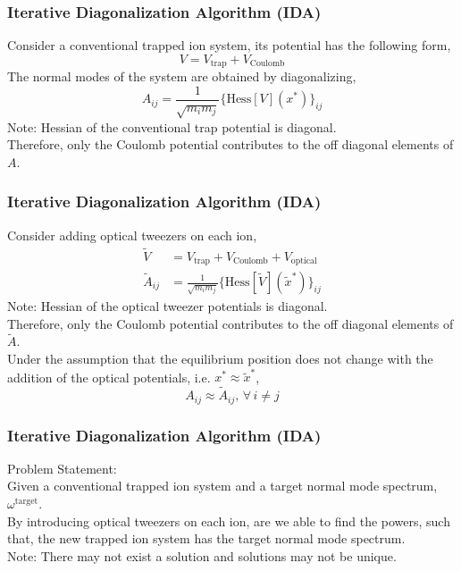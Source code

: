 \documentclass[10pt]{beamer}
\begin{document}
\begin{frame}[c]
\frametitle{Iterative Diagonalization Algorithm (IDA)}
Consider a conventional trapped ion system, its potential has the following form,
\begin{equation*}
V = V_{\mathrm{trap}} + V_{\mathrm{Coulomb}}
\end{equation*}
The normal modes of the system are obtained by diagonalizing,
\begin{equation*}
A_{ij} = \frac{1}{\sqrt{m_i m_j}} \{\mathrm{Hess}[V](x^*)\}_{ij}
\end{equation*}
Note: Hessian of the conventional trap potential is diagonal. \\[10pt]
Therefore, only the Coulomb potential contributes to the off diagonal elements of $A$.
\end{frame}

\begin{frame}[c]
\frametitle{Iterative Diagonalization Algorithm (IDA)}
Consider adding optical tweezers on each ion,
\begin{align*}
\tilde{V} &= V_{\mathrm{trap}} + V_{\mathrm{Coulomb}} + V_{\mathrm{optical}} \\
\tilde{A}_{ij} &= \frac{1}{\sqrt{m_i m_j}} \{\mathrm{Hess}[\tilde{V}](\tilde{x}^*)\}_{ij}
\end{align*}
Note: Hessian of the optical tweezer potentials is diagonal. \\[10pt]
Therefore, only the Coulomb potential contributes to the off diagonal elements of $\tilde{A}$. \\[10pt]
Under the assumption that the equilibrium position does not change with the addition of the optical potentials, i.e. $x^* \approx \tilde{x}^*$,
\begin{equation*}
A_{ij} \approx \tilde{A}_{ij}, \, \forall \, i \neq j
\end{equation*}
\end{frame}

\begin{frame}[c]
\frametitle{Iterative Diagonalization Algorithm (IDA)}
Problem Statement: \\
Given a conventional trapped ion system and a target normal mode spectrum, $\omega^{\mathrm{target}}$. \\[10pt]
By introducing optical tweezers on each ion, are we able to find the powers, such that, the new trapped ion system has the target normal mode spectrum. \\[10pt]
Note: There may not exist a solution and solutions may not be unique.
\end{frame}
\end{document}
